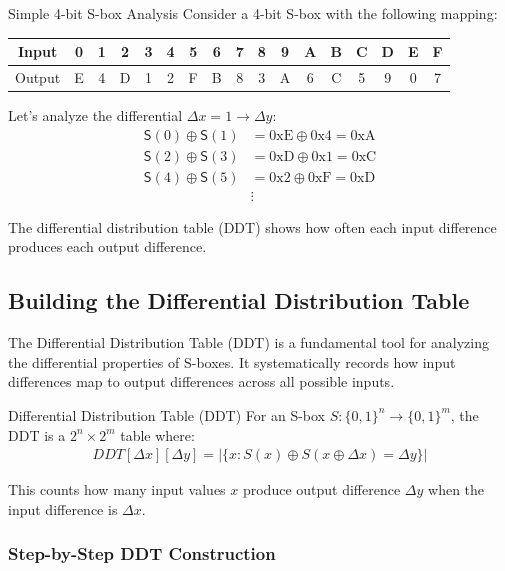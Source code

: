 \documentclass[12pt,a4paper]{article}
\theoremstyle{definition}
\newcommand{\diff}{\Delta}
\newcommand{\Sbox}[1]{\mathsf{S}(#1)}
\begin{document}
\begin{examplebox}{Simple 4-bit S-box Analysis}
Consider a 4-bit S-box with the following mapping:
\begin{center}
\begin{tabular}{c|cccccccccccccccc}
Input  & 0 & 1 & 2 & 3 & 4 & 5 & 6 & 7 & 8 & 9 & A & B & C & D & E & F \\
\hline
Output & E & 4 & D & 1 & 2 & F & B & 8 & 3 & A & 6 & C & 5 & 9 & 0 & 7 \\
\end{tabular}
\end{center}

Let's analyze the differential $\diff x = 1 \rightarrow \diff y$:
\begin{align}
\Sbox{0} \oplus \Sbox{1} &= \text{0xE} \oplus \text{0x4} = \text{0xA} \\
\Sbox{2} \oplus \Sbox{3} &= \text{0xD} \oplus \text{0x1} = \text{0xC} \\
\Sbox{4} \oplus \Sbox{5} &= \text{0x2} \oplus \text{0xF} = \text{0xD} \\
&\vdots
\end{align}

The differential distribution table (DDT) shows how often each input difference produces each output difference.
\end{examplebox}

\subsection{Building the Differential Distribution Table}

The Differential Distribution Table (DDT) is a fundamental tool for analyzing the differential properties of S-boxes. It systematically records how input differences map to output differences across all possible inputs.

\begin{definitionbox}{Differential Distribution Table (DDT)}
For an S-box $S: \{0,1\}^n \rightarrow \{0,1\}^m$, the DDT is a $2^n \times 2^m$ table where:
\begin{align}
DDT[\diff x][\diff y] = |\{x : S(x) \oplus S(x \oplus \diff x) = \diff y\}|
\end{align}

This counts how many input values $x$ produce output difference $\diff y$ when the input difference is $\diff x$.
\end{definitionbox}

\subsubsection{Step-by-Step DDT Construction}
\end{document}
